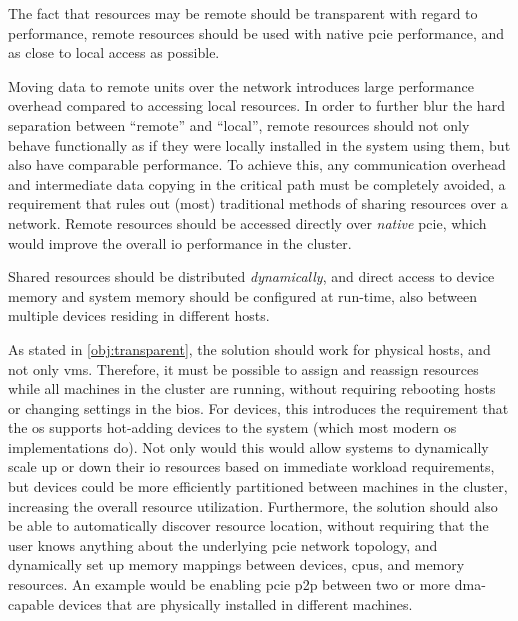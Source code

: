 \begin{objective}\label{obj:performance}
    The fact that resources may be remote should be transparent with regard to performance, remote resources should be used with native \gls{pcie} performance, and as close to local access as possible.
\end{objective}
Moving data to remote units over the network introduces large performance overhead compared to accessing local resources. 
In order to further blur the hard separation between ``remote'' and ``local'', remote resources should not only behave functionally as if they were locally installed in the system using them, but also have comparable performance.
To achieve this, any communication overhead and intermediate data copying in the critical path must be completely avoided, a requirement that rules out (most) traditional methods of sharing resources over a network. 
Remote resources should be accessed directly over \emph{native} \gls{pcie}, which would improve the overall \gls{io} performance in the cluster.



\begin{objective}\label{obj:dynamic}
    Shared resources should be distributed \emph{dynamically}, and direct access to device memory and system memory should be configured at run-time, also between multiple devices residing in different hosts.
\end{objective}
As stated in \cref{obj:transparent}, the solution should work for physical hosts, and not only \glspl{vm}. Therefore, it must be possible to assign and reassign resources while all machines in the cluster are running, without requiring rebooting hosts or changing settings in the \gls{bios}.
For devices, this introduces the requirement that the \gls{os} supports hot-adding devices to the system (which most modern \gls{os} implementations do).
Not only would this would allow systems to dynamically scale up or down their \gls{io} resources based on immediate workload requirements, but devices could be more efficiently partitioned between machines in the cluster, increasing the overall resource utilization. 
Furthermore, the solution should also be able to automatically discover resource location, without requiring that the user knows anything about the underlying \gls{pcie} network topology, and dynamically set up memory mappings between devices, \glspl{cpu}, and memory resources. An example would be enabling \gls{pcie} \gls{p2p} between two or more \gls{dma}-capable devices that are physically installed in different machines.

